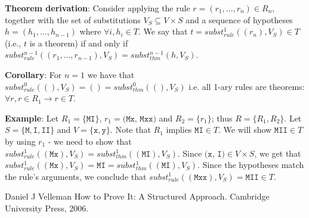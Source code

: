\documentclass{article}
\begin{document}
\textbf{Theorem derivation}: Consider applying the rule $r = (r_1, \ldots, r_n) \in R_n$, together with the set of substitutions $V_S \subseteq V \times S$ and a sequence of hypotheses $h = (h_1, \ldots, h_{n-1})$ where $\forall i, h_i \in T$. We say that $t = subst_{rule}^1((r_n), V_S) \in T$ (i.e., $t$ is a theorem) if and only if $subst_{rule}^{n-1}((r_1, \ldots, r_{n-1}), V_S) = subst_{thm}^{n-1}(h, V_S)$.

\textbf{Corollary}: For $n = 1$ we have that $subst_{rule}^0((), V_S) = () = subst_{thm}^0((), V_S)$ i.e. all 1-ary rules are theorems: $\forall r, r \in R_1 \to r \in T$.

\textbf{Example}: Let $R_1 = \{ \texttt{MI} \}$, $r_1 = \texttt{(Mx, Mxx)}$ and $R_2 = \{ r_1 \}$; thus $R = \{ R_1, R_2 \}$. Let $S = \{ \texttt{M}, \texttt{I}, \texttt{II} \}$ and $V = \{ \texttt{x}, \texttt{y} \}$. Note that $R_1$ implies $\texttt{MI} \in T$. We will show $\texttt{MII} \in T$ by using $r_1$ - we need to show that $subst_{rule}^1((\texttt{Mx}), V_S) = subst_{thm}^1((\texttt{MI}), V_S)$. Since $\texttt{(x, I)} \in V \times S$, we get that $subst_{rule}^1((\texttt{Mx}), V_S) = \texttt{MI} = subst_{thm}^1((\texttt{MI}), V_S)$. Since the hypotheses match the rule's arguments, we conclude that $subst_{rule}^1((\texttt{Mxx}), V_S) = \texttt{MII} \in T$.

\begin{thebibliography}{1}

Daniel J Velleman
\newblock How to Prove It: A Structured Approach.
\newblock Cambridge University Press, 2006.

\end{thebibliography}
\end{document}
